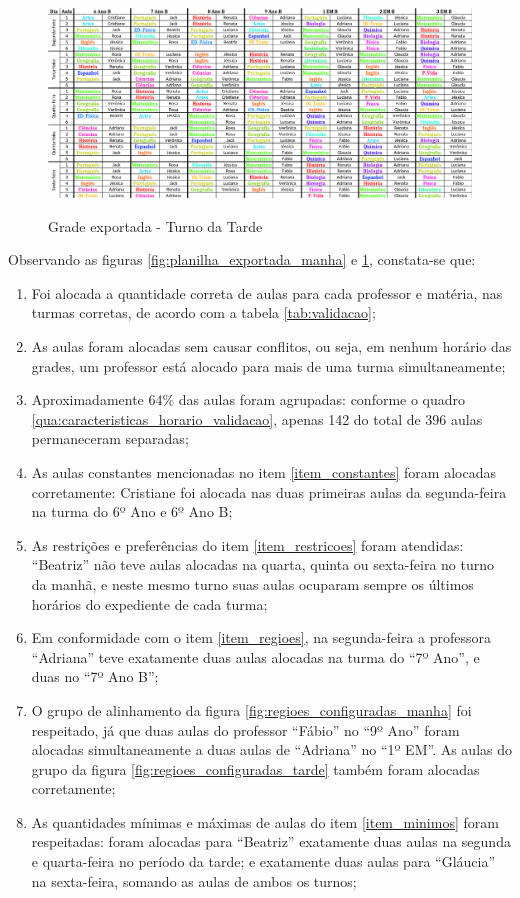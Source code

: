 \begin{figure}[p]
	\centering
	\caption{Grade exportada - Turno da Tarde}
	\includegraphics[width=1\textwidth]{./dados/figuras/planilha_exportada_tarde}
	\label{fig:planilha_exportada_tarde}
\end{figure}

\newpage
Observando as figuras \ref{fig:planilha_exportada_manha} e \ref{fig:planilha_exportada_tarde}, constata-se que:

\begin{enumerate}
	\item Foi alocada a quantidade correta de aulas para cada professor e matéria, nas turmas corretas, de acordo com a tabela \ref{tab:validacao};
	\item As aulas foram alocadas sem causar conflitos, ou seja, em nenhum horário das grades, um professor está alocado para mais de uma turma simultaneamente;
	\item Aproximadamente 64\% das aulas foram agrupadas: conforme o quadro \ref{qua:caracteristicas_horario_validacao}, apenas 142 do total de 396 aulas permaneceram separadas;
	\item As aulas constantes mencionadas no item \ref{item_constantes} foram alocadas corretamente: Cristiane foi alocada nas duas primeiras aulas da segunda-feira na turma do 6º Ano e 6º Ano B;
	\item As restrições e preferências do item \ref{item_restricoes} foram atendidas: ``Beatriz'' não teve aulas alocadas na quarta, quinta ou sexta-feira no turno da manhã, e neste mesmo turno suas aulas ocuparam sempre os últimos horários do expediente de cada turma;
	\item Em conformidade com o item \ref{item_regioes}, na segunda-feira a professora ``Adriana'' teve exatamente duas aulas alocadas na turma do ``7º Ano'', e duas no ``7º Ano B'';
	\item O grupo de alinhamento da figura \ref{fig:regioes_configuradas_manha} foi respeitado, já que duas aulas do professor ``Fábio'' no ``9º Ano'' foram alocadas simultaneamente a duas aulas de ``Adriana'' no ``1º EM''. As aulas do grupo da figura \ref{fig:regioes_configuradas_tarde} também foram alocadas corretamente;
	\item As quantidades mínimas e máximas de aulas do item \ref{item_minimos} foram respeitadas: foram alocadas para ``Beatriz'' exatamente duas aulas na segunda e quarta-feira no período da tarde; e exatamente duas aulas para ``Gláucia'' na sexta-feira, somando as aulas de ambos os turnos;
\end{enumerate}      


